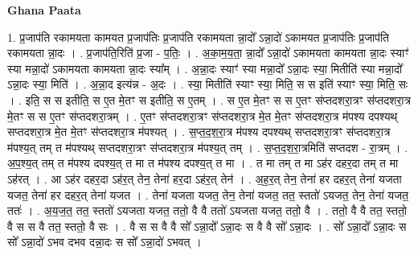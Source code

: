 \documentclass[17pt]{extarticle}
\begin{document}
\textbf{Ghana Paata } \newline

1. प्र॒जाप॑ति रकामयता कामयत प्र॒जाप॑तिः प्र॒जाप॑ति रकामयता न्ना॒दो᳚ ऽन्ना॒दो॑ ऽकामयत प्र॒जाप॑तिः प्र॒जाप॑ति रकामयता न्ना॒दः । . प्र॒जाप॑ति॒रिति॑ प्र॒जा - प॒तिः॒ । . अ॒का॒म॒य॒ता॒ न्ना॒दो᳚ ऽन्ना॒दो॑ ऽकामयता कामयता न्ना॒दः स्याꣳ॑ स्या मन्ना॒दो॑ ऽकामयता कामयता न्ना॒दः स्या᳚म् । . अ॒न्ना॒दः स्याꣳ॑ स्या मन्ना॒दो᳚ ऽन्ना॒दः स्या॒ मितीति॑ स्या मन्ना॒दो᳚ ऽन्ना॒दः स्या॒ मिति॑ । . अ॒न्ना॒द इत्य॑न्न - अ॒दः । . स्या॒ मितीति॑ स्याꣳ स्या॒ मिति॒ स स इति॑ स्याꣳ स्या॒ मिति॒ सः । . इति॒ स स इतीति॒ स ए॒त मे॒तꣳ स इतीति॒ स ए॒तम् । . स ए॒त मे॒तꣳ स स ए॒तꣳ स॑प्तदशरा॒त्रꣳ स॑प्तदशरा॒त्र मे॒तꣳ स स ए॒तꣳ स॑प्तदशरा॒त्रम् । . ए॒तꣳ स॑प्तदशरा॒त्रꣳ स॑प्तदशरा॒त्र मे॒त मे॒तꣳ स॑प्तदशरा॒त्र म॑पश्य दपश्यथ् सप्तदशरा॒त्र मे॒त मे॒तꣳ स॑प्तदशरा॒त्र म॑पश्यत् । . स॒प्त॒द॒श॒रा॒त्र म॑पश्य दपश्यथ् सप्तदशरा॒त्रꣳ स॑प्तदशरा॒त्र म॑पश्य॒त् तम् त म॑पश्यथ् सप्तदशरा॒त्रꣳ स॑प्तदशरा॒त्र म॑पश्य॒त् तम् । . स॒प्त॒द॒श॒रा॒त्रमिति॑ सप्तदश - रा॒त्रम् । . अ॒प॒श्य॒त् तम् त म॑पश्य दपश्य॒त् त मा त म॑पश्य दपश्य॒त् त मा । . त मा तम् त मा ऽह॑र दहर॒दा तम् त मा ऽह॑रत् । . आ ऽह॑र दहर॒दा ऽह॑र॒त् तेन॒ तेना॑ हर॒दा ऽह॑र॒त् तेन॑ । . अ॒ह॒र॒त् तेन॒ तेना॑ हर दहर॒त् तेना॑ यजता यजत॒ तेना॑ हर दहर॒त् तेना॑ यजत । . तेना॑ यजता यजत॒ तेन॒ तेना॑ यजत॒ तत॒ स्ततो॑ ऽयजत॒ तेन॒ तेना॑ यजत॒ ततः॑ । . अ॒य॒ज॒त॒ तत॒ स्ततो॑ ऽयजता यजत॒ ततो॒ वै वै ततो॑ ऽयजता यजत॒ ततो॒ वै । . ततो॒ वै वै तत॒ स्ततो॒ वै स स वै तत॒ स्ततो॒ वै सः । . वै स स वै वै सो᳚ ऽन्ना॒दो᳚ ऽन्ना॒दः स वै वै सो᳚ ऽन्ना॒दः । . सो᳚ ऽन्ना॒दो᳚ ऽन्ना॒दः स सो᳚ ऽन्ना॒दो॑ ऽभव दभव दन्ना॒दः स सो᳚ ऽन्ना॒दो॑ ऽभवत् । \newline
\end{document}
